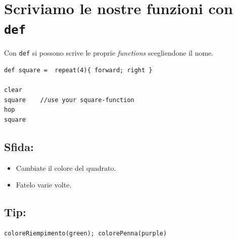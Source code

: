 \chapter{Scriviamo le nostre funzioni con \lstinline{def}}Con \lstinline{def} si possono scrive le proprie {\it functions} scegliendone il nome.

\begin{lstlisting}[basicstyle={\ttfamily\fontsize{20}{24}\selectfont},numbers=none]
def square =  repeat(4){ forward; right }  

clear
square    //use your square-function
hop
square
\end{lstlisting}
        
\section*{\color{BrickRed}Sfida:}


\begin{itemize}

\item {Cambiate il colore del quadrato.}
\item {Fatelo varie volte.}

\end{itemize}


\section*{\color{OliveGreen}Tip:}

\begin{lstlisting}[numbers=none]
coloreRiempimento(green); colorePenna(purple)
\end{lstlisting}
        
